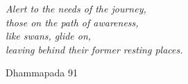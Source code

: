 \cleartorecto
\thispagestyle{empty}

\mbox{}\vfill

{\raggedright
\itshape
Alert to the needs of the journey,\\
those on the path of awareness,\\
like swans, glide on,\\
leaving behind their former resting places.

Dhammapada 91\par}

\vfill\mbox{}